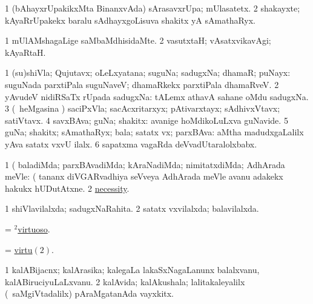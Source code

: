 \bentry 
{} 
\gl{\nA}
\expl{}
\bmng
\bnum
\num{1} (bAhayxrUpakikxMta BinanxvAda) sArasavxrUpa; mUlasatetx. 
\num{2} shakayxte; kAyaRrUpakekx baralu sAdhayxgoLisuva shakitx yA sAmathaRyx. 
\enum
\emng
\eentry

\bentry 
{} 
\gl{\kirxvi}
\expl{}
\bmng
\bnum
\num{1} mUlAMshagaLige saMbaMdhisidaMte. 
\num{2} vasutxtaH; vAsatxvikavAgi; kAyaRtaH. 
\enum
\emng
\eentry

\bentry
{} 
\gl{\nA}
\expl{}
\bmng
\bnum
\num{1} (su)shiVla; Qujutavx; oLeLxyatana; suguNa; sadugxNa; dhamaR; puNayx:  suguNada parxtiPala suguNaveV; dhamaRkekx parxtiPala dhamaRveV. 
\num{2} yAvudeV nidiRSaTx rUpada sadugxNa:  tALemx athavA sahane oMdu sadugxNa. 
\num{3} (\kanmu\ heMgasina \vi) saciPxVla; sacAcxritarxyx; pAtivarxtayx; sAdhivxVtavx; satiVtavx. 
\num{4} savxBAva; guNa; shakitx:  avanige hoMdikoLuLxva guNavide. 
\num{5} guNa; shakitx; sAmathaRyx; bala; satatx vx; parxBAva:  aMtha madudxgaLalilx yAva satatx vxvU ilalx. 
\num{6} sapatxma vagaRda deVvadUtaralolxbabx. 
\enum
\emng

\noindent 
\gl{\pagu}
\expl{}
\bmng
\bnum
\num{1}  (  baladiMda; parxBAvadiMda; kAraNadiMda; nimitatxdiMda; AdhArada meVle:  (  tananx diVGARvadhiya seVveya AdhArada meVle avanu adakekx hakukx hUDutAtxne. 
\num{2}  \hyperref{kandict_n.pdf}{N}{necessity pagu(3)}{necessity}. 
\enum
\emng
\eentry

\bentry 
{} 
\gl{\gu}
\expl{}
\bmng
\bnum
\num{1} shiVlavilalxda; sadugxNaRahita. 
\num{2} satatx vxvilalxda; balavilalxda. 
\enum
\emng
\eentry

\bentry 
{} 
\gl{\gu}
\expl{}
\bmng
 = \hyperlink{virtuoso(2)}{$^2$virtuoso}. 
\emng
\eentry

\bentry 
{} 
\gl{\nA}
\expl{}
\bmng
 = \hyperlink{virtu(2)}{virtu\((2)\)}. 
\emng
\eentry
 
\bentry
{} 
\gl{\nA}
\bmng
\bnum
\num{1} kalABijacnx; kalArasika; kalegaLa lakaSxNagaLanunx balalxvanu, kalABiruciyuLaLxvanu. 
\num{2} kalAvida; kalAkushala; lalitakaleyalilx (\kanmu\ saMgiVtadalilx) pAraMgatanAda vayxkitx. 
\enum
\emng
\eentry

